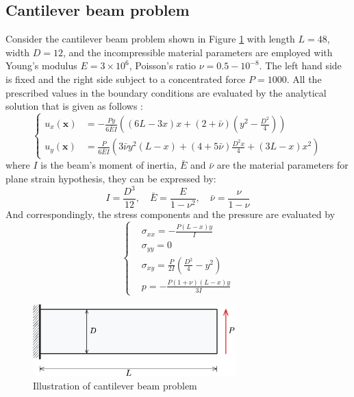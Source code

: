 \subsection{Cantilever beam problem}\label{sec:cantilever}
Consider the cantilever beam problem shown in Figure \ref{fg:cantilever_model} with length $L = 48$, width $D = 12$, and the incompressible material parameters are employed with Young's modulus $E = 3\times 10^6$, Poisson's ratio $\nu = 0.5-10^{-8}$. The left hand side is fixed and the right side subject to a concentrated force $P = 1000$. All the prescribed values in the boundary conditions are evaluated by the analytical solution that is given as follows \cite{timoshenko1969}:
\begin{equation}
\left\{
\begin{aligned}
u_x(\boldsymbol{x}) &= - \frac{Py}{6\bar{E}I} \left( (6L - 3x)x + (2 + \bar{\nu})(y^2 - \frac{D^2}{4}) \right) \\
u_y(\boldsymbol{x}) &= \frac{P}{6\bar{E}I} \left( 3 \bar{\nu} y^2(L-x) + (4+5\bar{\nu}) \frac{D^2x}{4} + (3L-x)x^2 \right)
\end{aligned}
\right.
\end{equation}
where $I$ is the beam's moment of inertia, $\bar{E}$ and $\bar{\nu}$ are the material parameters for plane strain hypothesis, they can be expressed by:
\begin{equation}
I = \frac{D^3}{12}, \quad \bar{E} = \frac{E}{1-\nu^2}, \quad \bar{\nu} = \frac{\nu}{1-\nu}
\end{equation}
And correspondingly, the stress components and the pressure are evaluated by
\begin{equation}\label{cantilever_stress}
\left\{
\begin{aligned}
&\sigma_{xx} = - \frac{P(L-x)y}{I} \\
&\sigma_{yy} = 0 \\
&\sigma_{xy} = \frac{P}{2I}(\frac{D^2}{4}-y^2) \\
&p = - \frac{P(1+\nu)(L-x)y}{3I}
\end{aligned}
\right.
\end{equation}

\begin{figure}[H]
\centering
\includegraphics[width=0.7\textwidth]{png/cantilever_model.png}
\caption{Illustration of cantilever beam problem}\label{fg:cantilever_model}
\end{figure}

